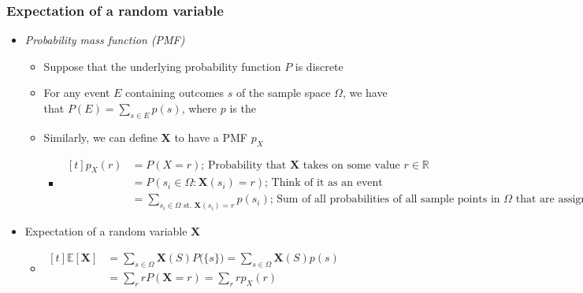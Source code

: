 \documentclass{article}
\begin{document}
\subsubsection{Expectation of a random variable}
\begin{itemize}
    \item \textit{Probability mass function (PMF)}
        \begin{itemize}
            \item Suppose that the underlying probability function $P$ is discrete
            \item For any event $E$ containing outcomes $s$ of the sample space $\Omega$, we have that $P(E) = \sum\limits_{s \in E}p(s)$, where $p$ is the 
            \item Similarly, we can define $\boldsymbol{X}$ to have a PMF $p_{X}$
                \begin{itemize}
                    \item $\begin{aligned}[t]
                                p_{X}(r) &= P(X = r) \text{; Probability that $\boldsymbol{X}$ takes on some value $r \in \mathds{R}$}\\
                                         & = P({s_{i} \in \Omega} : \boldsymbol{X}(s_{i}) = r) \text{; Think of it as an event}\\
                                         & = \sum\limits_{s_{i} \in \Omega \text{ st. } \boldsymbol{X}(s_{i}) = r}p(s_{i}) \text{; Sum of all probabilities of all sample points in $\Omega$ that are assigned the value of $r$}
                            \end{aligned}$
                \end{itemize}
        \end{itemize}
    \item Expectation of a random variable $\boldsymbol{X}$
        \begin{itemize}
            \item $\begin{aligned}[t]
                        \mathds{E}[\boldsymbol{X}] &= \sum\limits_{s \in \Omega}\boldsymbol{X}(S)P\bigl(\{s\}\bigr) = \sum\limits_{s \in \Omega}\boldsymbol{X}(S)p(s)\\
                                                   &= \sum\limits_{r}rP(\boldsymbol{X}=r) = \sum\limits_{r}rp_{X}(r)
                    \end{aligned}$
        \end{itemize}
\end{itemize}
\end{document}
